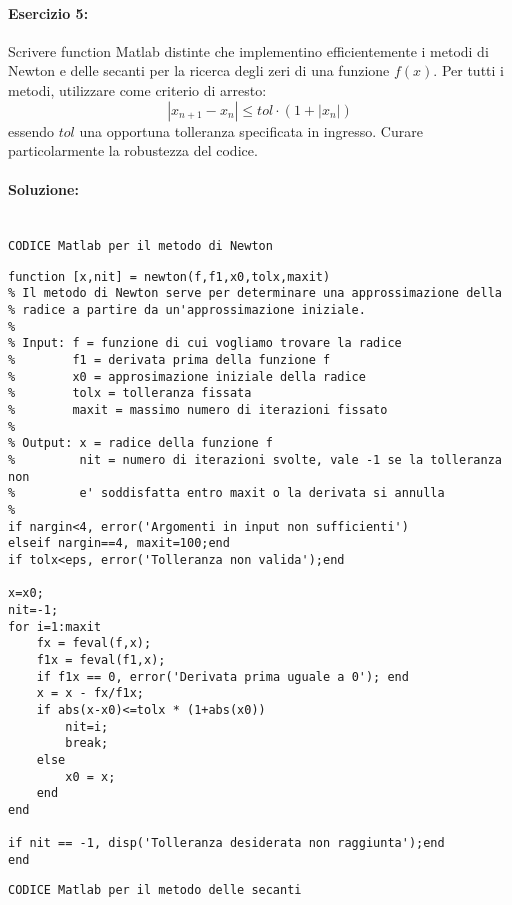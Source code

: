 \documentclass[12pt]{article}
\begin{document}
\paragraph{Esercizio 5:}
Scrivere function Matlab distinte che implementino efficientemente i metodi di Newton e delle secanti per la ricerca degli zeri di una funzione \(f(x)\). 
Per tutti i metodi, utilizzare come criterio di arresto:
$$|x_{n+1} - x_n| \leq tol \cdot (1 + |x_n|)$$
essendo \(tol\) una opportuna tolleranza specificata in ingresso. Curare particolarmente la robustezza del codice.
\paragraph{Soluzione:}\mbox{}\\
\texttt{CODICE Matlab per il metodo di Newton}
\begin{lstlisting}[frame=single]
function [x,nit] = newton(f,f1,x0,tolx,maxit)
% Il metodo di Newton serve per determinare una approssimazione della
% radice a partire da un'approssimazione iniziale.
% 
% Input: f = funzione di cui vogliamo trovare la radice
%        f1 = derivata prima della funzione f
%        x0 = approsimazione iniziale della radice
%        tolx = tolleranza fissata
%        maxit = massimo numero di iterazioni fissato
%
% Output: x = radice della funzione f
%         nit = numero di iterazioni svolte, vale -1 se la tolleranza non 
%         e' soddisfatta entro maxit o la derivata si annulla
%
if nargin<4, error('Argomenti in input non sufficienti')
elseif nargin==4, maxit=100;end
if tolx<eps, error('Tolleranza non valida');end

x=x0;
nit=-1;
for i=1:maxit
    fx = feval(f,x);
    f1x = feval(f1,x);
    if f1x == 0, error('Derivata prima uguale a 0'); end
    x = x - fx/f1x;
    if abs(x-x0)<=tolx * (1+abs(x0))
        nit=i;
        break;
    else
        x0 = x;
    end
end

if nit == -1, disp('Tolleranza desiderata non raggiunta');end
end 
\end{lstlisting}
\texttt{CODICE Matlab per il metodo delle secanti}
\end{document}
